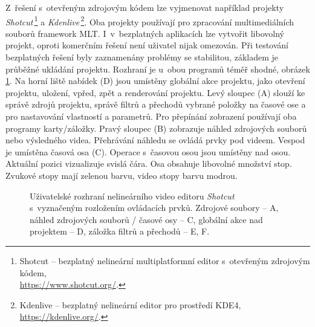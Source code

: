 Z~řešení s~otevřeným zdrojovým kódem lze vyjmenovat například projekty \textit{Shotcut}\,\footnote{Shotcut -- bezplatný nelineární multiplatformní editor s~otevřeným zdrojovým kódem,\\\url{https://www.shotcut.org/}.} a \textit{Kdenlive}\,\footnote{Kdenlive -- bezplatný nelineární editor pro prostředí KDE4, \url{https://kdenlive.org/}.}. Oba projekty používají pro zpracování multimediálních souborů framework MLT. I~v~bezplatných aplikacích lze vytvořit libovolný projekt, oproti komerčním řešení není uživatel nijak omezován. Při testování bezplatných řešení byly zaznamenány problémy se stabilitou, základem je průběžné ukládání projektu. Rozhraní je u~obou programů téměř shodné, obrázek \ref{img:shotcut}. Na horní liště nabídek (D) jsou umístěny globální akce projektu, jako otevření projektu, uložení, vpřed, zpět a renderování projektu. Levý sloupec (A) slouží ke správě zdrojů projektu, správě filtrů a přechodů vybrané položky na časové ose a pro nastavování vlastností a parametrů. Pro přepínání zobrazení používají oba programy karty/záložky. Pravý sloupec (B) zobrazuje náhled zdrojových souborů nebo výsledného videa. Přehrávání náhledu se ovládá prvky pod videem. Vespod je umístěna časová osa (C). Operace s~časovou osou jsou umístěny nad osou. Aktuální pozici vizualizuje svislá čára. Osa obsahuje libovolné množství stop. Zvukové stopy mají zelenou barvu, video stopy barvu modrou.
\begin{figure}[h]
	\centering
	\caption{Uživatelské rozhraní nelineárního video editoru \textit{Shotcut} s~vyznačeným rozložením ovládacích prvků. Zdrojové soubory -- A, náhled zdrojových souborů / časové osy -- C, globální akce nad projektem -- D, záložka filtrů a přechodů -- E, F.}\label{img:shotcut}
\end{figure}

